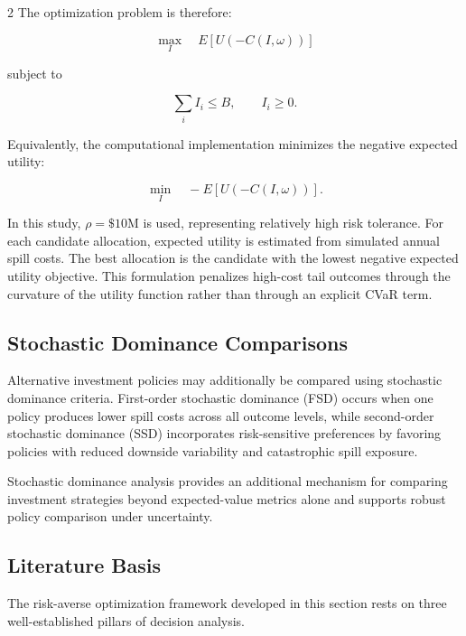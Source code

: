 \documentclass[10pt]{article}
\begin{document}
\begin{multicols}{2}
The optimization problem is therefore:

\[
\max_I \quad E[U(-C(I,\omega))]
\]

subject to

\[
\sum_i I_i \le B,
\qquad
I_i \ge 0.
\]

Equivalently, the computational implementation minimizes the negative
expected utility:

\[
\min_I \quad -E[U(-C(I,\omega))].
\]

In this study, $\rho = \$10$M is used, representing relatively high risk
tolerance. For each candidate allocation, expected utility is estimated
from simulated annual spill costs. The best allocation is the candidate
with the lowest negative expected utility objective. This formulation
penalizes high-cost tail outcomes through the curvature of the utility
function rather than through an explicit CVaR term.

\subsection{Stochastic Dominance Comparisons}

Alternative investment policies may additionally be compared using stochastic dominance criteria. First-order stochastic dominance (FSD) occurs when one policy produces lower spill costs across all outcome levels, while second-order stochastic dominance (SSD) incorporates risk-sensitive preferences by favoring policies with reduced downside variability and catastrophic spill exposure.

Stochastic dominance analysis provides an additional mechanism for comparing investment strategies beyond expected-value metrics alone and supports robust policy comparison under uncertainty.

\subsection{Literature Basis}

The risk-averse optimization framework developed in this section rests
on three well-established pillars of decision analysis.
 

\end{multicols}
\end{document}

